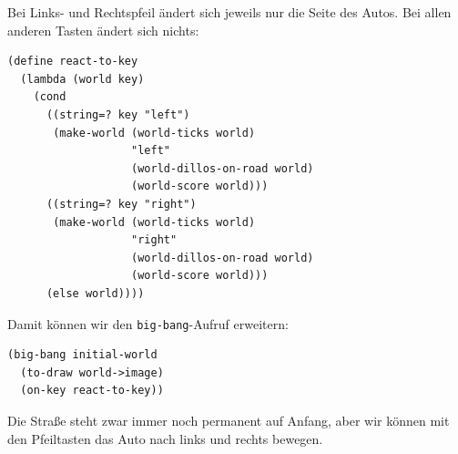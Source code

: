 %
Bei Links- und Rechtspfeil ändert sich jeweils nur die Seite des
Autos.  Bei allen anderen Tasten ändert sich nichts:
%
\begin{lstlisting}
(define react-to-key
  (lambda (world key)
    (cond
      ((string=? key "left")
       (make-world (world-ticks world)
                   "left"
                   (world-dillos-on-road world)
                   (world-score world)))
      ((string=? key "right")
       (make-world (world-ticks world)
                   "right"
                   (world-dillos-on-road world)
                   (world-score world)))
      (else world))))
\end{lstlisting}
%
Damit können wir den \lstinline{big-bang}-Aufruf erweitern:
%
\begin{lstlisting}
(big-bang initial-world
  (to-draw world->image)
  (on-key react-to-key))
\end{lstlisting}
%
Die Straße steht zwar immer noch permanent auf Anfang, aber wir können
mit den Pfeiltasten das Auto nach links und rechts bewegen.

